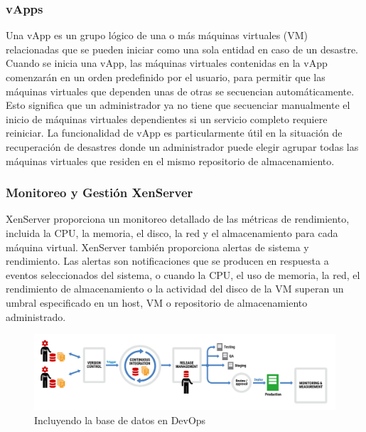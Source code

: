 \documentclass[preprint,12pt]{elsarticle}
\begin{document}
\subsubsection{\textbf{vApps}}
Una vApp es un grupo lógico de una o más máquinas virtuales (VM) relacionadas que se pueden iniciar como una sola entidad en caso de un desastre. Cuando se inicia una vApp, las máquinas virtuales contenidas en la vApp comenzarán en un orden predefinido por el usuario, para permitir que las máquinas virtuales que dependen unas de otras se secuencian automáticamente. Esto significa que un administrador ya no tiene que secuenciar manualmente el inicio de máquinas virtuales dependientes si un servicio completo requiere reiniciar.  La funcionalidad de vApp es particularmente útil en la situación de recuperación de desastres donde un administrador puede elegir agrupar todas las máquinas virtuales que residen en el mismo repositorio de almacenamiento.

\subsubsection{\textbf{Monitoreo y Gestión XenServer}}
XenServer proporciona un monitoreo detallado de las métricas de rendimiento, incluida la CPU, la memoria, el disco, la red  y el almacenamiento para cada máquina virtual.
XenServer también proporciona alertas de sistema y rendimiento. Las alertas son notificaciones que se producen en respuesta a eventos seleccionados del sistema, o cuando la CPU, el uso de memoria, la red, el rendimiento de almacenamiento o la actividad del disco de la VM superan un umbral especificado en un host, VM o repositorio de almacenamiento administrado.\cite{Citrix2018}

\begin{figure}[htb]
	\begin{center}
		\includegraphics[width=14cm]{./IMAGENES/basededatos_1} 
		\caption{Incluyendo la base de datos en DevOps}
	\end{center}
\end{figure}

\end{document}
